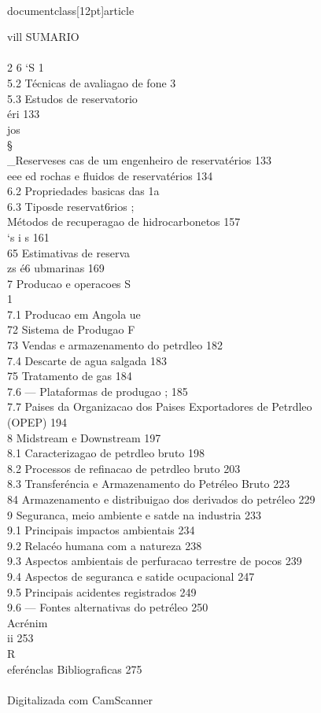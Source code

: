 \\documentclass[12pt]{article}
\begin{document}
vill SUMARIO\\
\\
2 6 ‘S 1\\
5.2 Técnicas de avaliagao de fone 3\\
5.3 Estudos de reservatorio\\
éri 133\\
jos\\
§\\_Reserveses cas de um engenheiro de reservatérios 133\\
eee ed rochas e fluidos de reservatérios 134\\
6.2 Propriedades basicas das 1a\\
6.3  Tiposde reservat6rios ;\\
Métodos de recuperagao de hidrocarbonetos 157\\
‘s i s 161\\
65 Estimativas de reserva\\
zs é6 ubmarinas 169\\
7 Producao e operacoes S\\
1\\
7.1 Producao em Angola ue\\
72 Sistema de Produgao F\\
73 Vendas e armazenamento do petrdleo 182\\
7.4 Descarte de agua salgada 183\\
75  Tratamento de gas 184\\
7.6 — Plataformas de produgao ; 185\\
7.7 Paises da Organizacao dos Paises Exportadores de Petrdleo\\
(OPEP) 194\\
8 Midstream e Downstream 197\\
8.1 Caracterizagao de petrdleo bruto 198\\
8.2 Processos de refinacao de petrdleo bruto 203\\
8.3 Transferéncia e Armazenamento do Petréleo Bruto 223\\
84  Armazenamento e distribuigao dos derivados do petréleo 229\\
9 Seguranca, meio ambiente e satde na industria 233\\
9.1 Principais impactos ambientais 234\\
9.2 Relacéo humana com a natureza 238\\
9.3 Aspectos ambientais de perfuracao terrestre de pocos 239\\
9.4 Aspectos de seguranca e satide ocupacional 247\\
9.5 Principais acidentes registrados 249\\
9.6 — Fontes alternativas do petréleo 250\\
Acrénim\\
ii 253\\
R\\
eferénclas Bibliograficas 275\\
\\
Digitalizada com CamScanner\\
\end{document}
